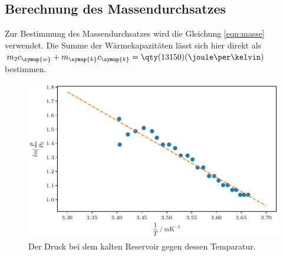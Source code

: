 \subsection{Berechnung des Massendurchsatzes}

Zur Bestimmung des Massendurchsatzes wird die Gleichung \ref{eqn:masse} verwendet. Die Summe der Wärmekapazitäten lässt sich hier 
direkt als $m_2c_{\symup{w}}+m_{\symup{k}}c_{\symup{k}}=\qty(13150)(\joule\per\kelvin)$ bestimmen.

\begin{figure}
    \centering
    \includegraphics{verdampfplot.pdf}
    \caption{Der Druck bei dem kalten Reservoir gegen dessen Temparatur.}
    \label{fig:druckkalt}
\end{figure}